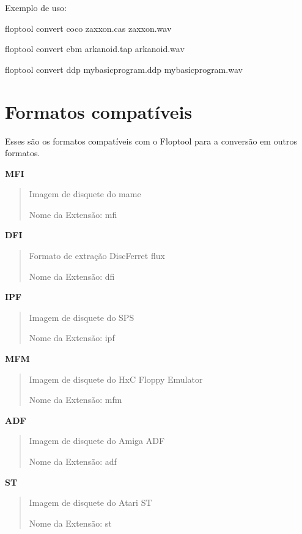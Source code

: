 \documentclass[letterpaper,10pt,brazil]{sphinxmanual}
\begin{document}
Exemplo de uso:

\begin{DUlineblock}{0em}
\item[] floptool convert coco zaxxon.cas zaxxon.wav
\item[] floptool convert cbm arkanoid.tap arkanoid.wav
\item[] floptool convert ddp mybasicprogram.ddp mybasicprogram.wav
\end{DUlineblock}
\clearpage

\section{Formatos compatíveis}
\label{tools/floptool:formatos-compativeis}
Esses são os formatos compatíveis com o Floptool para a conversão em
outros formatos.

\textbf{MFI}
\begin{quote}

Imagem de disquete do mame

Nome da Extensão: mfi
\end{quote}

\textbf{DFI}
\begin{quote}

Formato de extração DiscFerret flux

Nome da Extensão: dfi
\end{quote}

\textbf{IPF}
\begin{quote}

Imagem de disquete do SPS

Nome da Extensão: ipf
\end{quote}

\textbf{MFM}
\begin{quote}

Imagem de disquete do HxC Floppy Emulator

Nome da Extensão: mfm
\end{quote}

\textbf{ADF}
\begin{quote}

Imagem de disquete do Amiga ADF

Nome da Extensão: adf
\end{quote}

\textbf{ST}
\begin{quote}

Imagem de disquete do Atari ST

Nome da Extensão: st
\end{quote}
\end{document}
